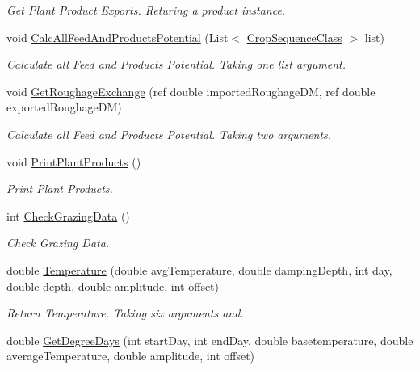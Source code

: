 \begin{DoxyCompactItemize}
\begin{DoxyCompactList}\small\item\em Get Plant Product Exports. Returing a product instance. \end{DoxyCompactList}\item 
void \mbox{\hyperlink{class_global_vars_ae96481c7f7db5cf25742d29ced57b3c0}{Calc\+All\+Feed\+And\+Products\+Potential}} (List$<$ \mbox{\hyperlink{class_crop_sequence_class}{Crop\+Sequence\+Class}} $>$ list)
\begin{DoxyCompactList}\small\item\em Calculate all Feed and Products Potential. Taking one list argument. \end{DoxyCompactList}\item 
void \mbox{\hyperlink{class_global_vars_a9ae8f3fa07b378ec836fa8519659f07e}{Get\+Roughage\+Exchange}} (ref double imported\+Roughage\+DM, ref double exported\+Roughage\+DM)
\begin{DoxyCompactList}\small\item\em Calculate all Feed and Products Potential. Taking two arguments. \end{DoxyCompactList}\item 
void \mbox{\hyperlink{class_global_vars_ad1d5b8cf02cda37a3323a94dff915e00}{Print\+Plant\+Products}} ()
\begin{DoxyCompactList}\small\item\em Print Plant Products. \end{DoxyCompactList}\item 
int \mbox{\hyperlink{class_global_vars_ad893d360c7c5ac004598509b57351d90}{Check\+Grazing\+Data}} ()
\begin{DoxyCompactList}\small\item\em Check Grazing Data. \end{DoxyCompactList}\item 
double \mbox{\hyperlink{class_global_vars_a491bc8bab10f56f0c721d2b86c6e5a30}{Temperature}} (double avg\+Temperature, double damping\+Depth, int day, double depth, double amplitude, int offset)
\begin{DoxyCompactList}\small\item\em Return Temperature. Taking six arguments and. \end{DoxyCompactList}\item 
double \mbox{\hyperlink{class_global_vars_ab8f8dbf77cd4737e026fd884198851a3}{Get\+Degree\+Days}} (int start\+Day, int end\+Day, double basetemperature, double average\+Temperature, double amplitude, int offset)

\end{DoxyCompactItemize}
